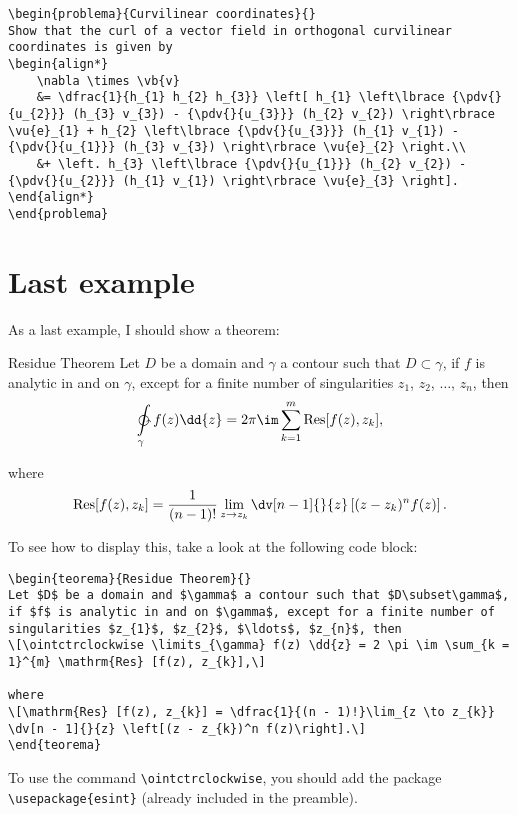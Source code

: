 \begin{verbatim}
\begin{problema}{Curvilinear coordinates}{}
Show that the curl of a vector field in orthogonal curvilinear coordinates is given by
\begin{align*}
    \nabla \times \vb{v}
    &= \dfrac{1}{h_{1} h_{2} h_{3}} \left[ h_{1} \left\lbrace {\pdv{}{u_{2}}} (h_{3} v_{3}) - {\pdv{}{u_{3}}} (h_{2} v_{2}) \right\rbrace \vu{e}_{1} + h_{2} \left\lbrace {\pdv{}{u_{3}}} (h_{1} v_{1}) - {\pdv{}{u_{1}}} (h_{3} v_{3}) \right\rbrace \vu{e}_{2} \right.\\
    &+ \left. h_{3} \left\lbrace {\pdv{}{u_{1}}} (h_{2} v_{2}) - {\pdv{}{u_{2}}} (h_{1} v_{1}) \right\rbrace \vu{e}_{3} \right].
\end{align*}
\end{problema}
\end{verbatim}

\section{Last example}
As a last example, I should show a theorem:

\begin{teorema}{Residue Theorem}{}
Let $D$ be a domain and $\gamma$ a contour such that $D\subset\gamma$, if $f$ is analytic in and on $\gamma$, except for a finite number of singularities $z_{1}$, $z_{2}$, $\ldots$, $z_{n}$, then
\[\ointctrclockwise \limits_{\gamma} f(z) \dd{z} = 2 \pi \im \sum_{k = 1}^{m} \mathrm{Res} [f(z), z_{k}],\]

where
\[\mathrm{Res} [f(z), z_{k}] = \dfrac{1}{(n - 1)!}\lim_{z \to z_{k}} \dv[n - 1]{}{z} \left[(z - z_{k})^n f(z)\right].\]
\end{teorema}

To see how to display this, take a look at the following code block:

\begin{verbatim}
\begin{teorema}{Residue Theorem}{}
Let $D$ be a domain and $\gamma$ a contour such that $D\subset\gamma$, if $f$ is analytic in and on $\gamma$, except for a finite number of singularities $z_{1}$, $z_{2}$, $\ldots$, $z_{n}$, then
\[\ointctrclockwise \limits_{\gamma} f(z) \dd{z} = 2 \pi \im \sum_{k = 1}^{m} \mathrm{Res} [f(z), z_{k}],\]

where
\[\mathrm{Res} [f(z), z_{k}] = \dfrac{1}{(n - 1)!}\lim_{z \to z_{k}} \dv[n - 1]{}{z} \left[(z - z_{k})^n f(z)\right].\]
\end{teorema}
\end{verbatim}

To use the command \verb|\ointctrclockwise|, you should add the package \verb|\usepackage{esint}| (already included in the preamble). 
